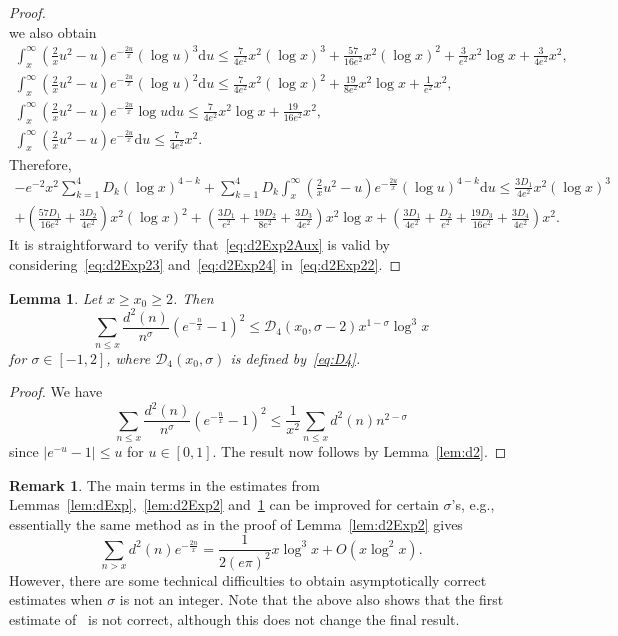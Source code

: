 \documentclass[a4paper,reqno]{amsart}
\newtheorem{lemma}[theorem]{Lemma}
\theoremstyle{definition}
\newtheorem{remark}{Remark}
\newcommand{\dif}[1]{\mathrm{d}#1}
\begin{document}
\begin{proof}
\[\]
we also obtain
\begin{gather*}
\int_{x}^{\infty}\left(\frac{2}{x}u^2-u\right)e^{-\frac{2u}{x}}(\log{u})^{3}\dif{u} \leq \frac{7}{4e^2}x^2(\log{x})^{3} + \frac{57}{16e^2}x^2(\log{x})^{2} + \frac{3}{e^2}x^2\log{x} + \frac{3}{4e^2}x^2, \\
\int_{x}^{\infty}\left(\frac{2}{x}u^2-u\right)e^{-\frac{2u}{x}}(\log{u})^{2}\dif{u} \leq \frac{7}{4e^2}x^2(\log{x})^2 + \frac{19}{8e^2}x^{2}\log{x} + \frac{1}{e^2}x^2, \\
\int_{x}^{\infty}\left(\frac{2}{x}u^2-u\right)e^{-\frac{2u}{x}}\log{u}\dif{u} \leq \frac{7}{4e^2}x^2\log{x} + \frac{19}{16e^2}x^2, \\
\int_{x}^{\infty}\left(\frac{2}{x}u^2-u\right)e^{-\frac{2u}{x}}\dif{u} \leq \frac{7}{4e^2}x^2.
\end{gather*}
Therefore,
\begin{multline}
\label{eq:d2Exp24}
-e^{-2}x^2\sum_{k=1}^{4}D_k(\log{x})^{4-k} + \sum_{k=1}^{4}D_k\int_{x}^{\infty}\left(\frac{2}{x}u^2-u\right)e^{-\frac{2u}{x}}(\log{u})^{4-k}\dif{u} \leq \frac{3D_1}{4e^2}x^2(\log{x})^{3} \\ 
+ \left(\frac{57D_1}{16e^2}+\frac{3D_2}{4e^2}\right)x^2(\log{x})^2 + \left(\frac{3D_1}{e^2}+\frac{19D_2}{8e^2}+\frac{3D_3}{4e^2}\right)x^{2}\log{x} + \left(\frac{3D_1}{4e^2}+\frac{D_2}{e^2}+\frac{19D_3}{16e^2}+\frac{3D_4}{4e^2}\right)x^2.
\end{multline}
It is straightforward to verify that~\eqref{eq:d2Exp2Aux} is valid by considering~\eqref{eq:d2Exp23} and~\eqref{eq:d2Exp24} in~\eqref{eq:d2Exp22}.
\end{proof}

\begin{lemma}
\label{lem:d2Exp3}
Let $x\geq x_0\geq 2$. Then
\[
\sum_{n\leq x}\frac{d^{2}(n)}{n^\sigma}\left(e^{-\frac{n}{x}}-1\right)^{2} \leq \mathcal{D}_{4}(x_0,\sigma-2)x^{1-\sigma}\log^{3}{x}
\]
for $\sigma\in[-1,2]$, where $\mathcal{D}_{4}(x_0,\sigma)$ is defined by~\eqref{eq:D4}.
\end{lemma}

\begin{proof}
We have 
\[
\sum_{n\leq x}\frac{d^{2}(n)}{n^\sigma}\left(e^{-\frac{n}{x}}-1\right)^{2} \leq \frac{1}{x^2}\sum_{n\leq x}d^{2}(n)n^{2-\sigma}
\]
since $\left|e^{-u}-1\right|\leq u$ for $u\in[0,1]$. The result now follows by Lemma~\ref{lem:d2}.
\end{proof}

\begin{remark}
The main terms in the estimates from Lemmas~\ref{lem:dExp},~\ref{lem:d2Exp2} and~\ref{lem:d2Exp3} can be improved for certain $\sigma$'s, e.g., essentially the same method as in the proof of Lemma~\ref{lem:d2Exp2} gives
\[
\sum_{n>x}d^{2}(n)e^{-\frac{2n}{x}} = \frac{1}{2(e\pi)^2}x\log^{3}{x} + O\left(x\log^{2}{x}\right).
\]
However, there are some technical difficulties to obtain asymptotically correct estimates when $\sigma$ is not an integer. Note that the above also shows that the first estimate of~\cite[p.~138]{Ivic} is not correct, although this does not change the final result.
\end{remark}
\end{document}
